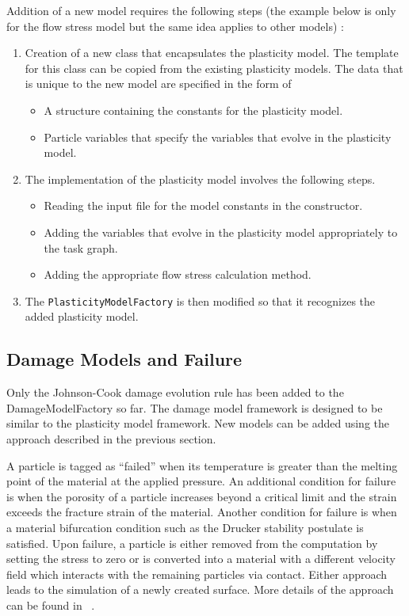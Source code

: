 Addition of a new model requires the following steps (the example below is only
for the flow stress model but the same idea applies to other models) :
\begin{enumerate}
    \item Creation of a new class that encapsulates the plasticity 
    model.  The template for this class can be copied from the
    existing plasticity models.  The data that is unique to 
    the new model are specified in the form of 
    \begin{itemize}
      \item A structure containing the constants for the plasticity
            model.
      \item Particle variables that specify the variables that 
            evolve in the plasticity model.
    \end{itemize}
    \item The implementation of the plasticity model involves the
    following steps.
    \begin{itemize}
      \item Reading the input file for the model constants in the
            constructor.
      \item Adding the variables that evolve in the plasticity model
            appropriately to the task graph.
      \item Adding the appropriate flow stress calculation method.
    \end{itemize}
    \item The \verb+PlasticityModelFactory+ is then modified so that
          it recognizes the added plasticity model.
\end{enumerate}

\subsection{Damage Models and Failure}
Only the Johnson-Cook damage evolution rule has been added to the 
DamageModelFactory so far.  The damage model framework is designed 
to be similar to the plasticity model framework.  New models can
be added using the approach described in the previous section.

  A particle is tagged as ``failed'' when its temperature is greater than the
  melting point of the material at the applied pressure.  An additional
  condition for failure is when the porosity of a particle increases beyond a
  critical limit and the strain exceeds the fracture strain of the material.  
  Another condition for failure is when a material bifurcation 
  condition such as the Drucker stability postulate is satisfied.  Upon failure,
  a particle is either removed from the computation by setting the stress to
  zero or is converted into a material with a different velocity field 
  which interacts with the remaining particles via contact.  Either approach
  leads to the simulation of a newly created surface.  More details of the
  approach can be found in ~\cite{Banerjee2004a,Banerjee2004c,Banerjee2005}.

